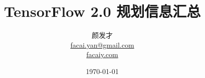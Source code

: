 
\title{TensorFlow 2.0 规划信息汇总}
\author{颜发才 \\
        \href{mailto:facai.yan@gmail.com}{\tiny facai.yan@gmail.com} \\[-1ex]
        \href{https://facaiy.com}{\tiny facaiy.com}}
\date{\today}
